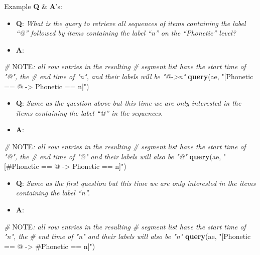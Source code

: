 \documentclass[]{book}
\newenvironment{Shaded}{\begin{snugshade}}{\end{snugshade}}
\newcommand{\AlertTok}[1]{\textcolor[rgb]{0.94,0.16,0.16}{#1}}
\newcommand{\CommentTok}[1]{\textcolor[rgb]{0.56,0.35,0.01}{\textit{#1}}}
\newcommand{\KeywordTok}[1]{\textcolor[rgb]{0.13,0.29,0.53}{\textbf{#1}}}
\newcommand{\NormalTok}[1]{#1}
\newcommand{\StringTok}[1]{\textcolor[rgb]{0.31,0.60,0.02}{#1}}
\providecommand{\tightlist}{%
  \setlength{\itemsep}{0pt}\setlength{\parskip}{0pt}}
\theoremstyle{definition}
\theoremstyle{definition}
\theoremstyle{definition}
\theoremstyle{remark}
\begin{document}
Example \textbf{Q} \& \textbf{A}'s:

\begin{itemize}
\tightlist
\item
  \textbf{Q}: \emph{What is the query to retrieve all sequences of items
  containing the label ``@'' followed by items containing the label
  ``n'' on the ``Phonetic'' level?}
\item
  \textbf{A}:
\end{itemize}

\begin{Shaded}
\begin{Highlighting}[]
\CommentTok{# }\AlertTok{NOTE}\CommentTok{: all row entries in the resulting }
\CommentTok{# segment list have the start time of "@", the }
\CommentTok{# end time of "n", and their labels will be "@->n"}
\KeywordTok{query}\NormalTok{(ae, }\StringTok{"[Phonetic == @ -> Phonetic == n]"}\NormalTok{)}
\end{Highlighting}
\end{Shaded}

\begin{itemize}
\tightlist
\item
  \textbf{Q}: \emph{Same as the question above but this time we are only
  interested in the items containing the label ``@'' in the sequences.}
\item
  \textbf{A}:
\end{itemize}

\begin{Shaded}
\begin{Highlighting}[]
\CommentTok{# }\AlertTok{NOTE}\CommentTok{: all row entries in the resulting}
\CommentTok{# segment list have the start time of "@", the}
\CommentTok{# end time of "@" and their labels will also be "@"}
\KeywordTok{query}\NormalTok{(ae, }\StringTok{"[#Phonetic == @ -> Phonetic == n]"}\NormalTok{)}
\end{Highlighting}
\end{Shaded}

\begin{itemize}
\tightlist
\item
  \textbf{Q}: \emph{Same as the first question but this time we are only
  interested in the items containing the label ``n''.}
\item
  \textbf{A}:
\end{itemize}

\begin{Shaded}
\begin{Highlighting}[]
\CommentTok{# }\AlertTok{NOTE}\CommentTok{: all row entries in the resulting}
\CommentTok{# segment list have the start time of "n", the}
\CommentTok{# end time of "n" and their labels will also be "n"}
\KeywordTok{query}\NormalTok{(ae, }\StringTok{"[Phonetic == @ -> #Phonetic == n]"}\NormalTok{)}
\end{Highlighting}
\end{Shaded}
\end{document}
